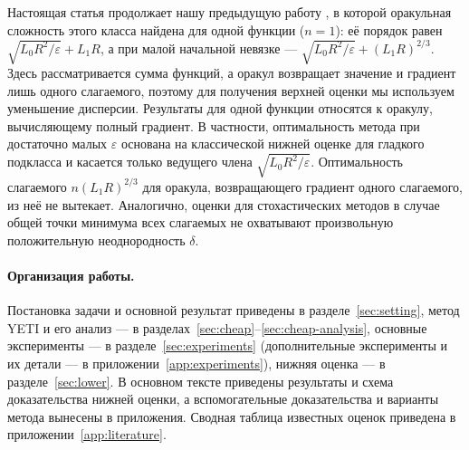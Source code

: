 Настоящая статья продолжает нашу предыдущую работу \citet{rudomanov2026everest}, в которой
оракульная сложность этого класса найдена для одной функции ($n=1$):
её порядок равен $\sqrt{L_0R^2/\varepsilon}+L_1R$, а при малой
начальной невязке --- $\sqrt{L_0R^2/\varepsilon}+(L_1R)^{2/3}$.
Здесь рассматривается сумма функций, а оракул возвращает значение
и градиент лишь одного слагаемого, поэтому для получения верхней оценки
мы используем уменьшение дисперсии.
Результаты для одной функции
\citep{vankov2025optimizing,tyurin2026accelerated} относятся
к оракулу, вычисляющему полный градиент. В частности, оптимальность
метода \citet{tyurin2026accelerated} при достаточно малых $\varepsilon$ основана
на классической нижней оценке для гладкого подкласса и касается только
ведущего члена $\sqrt{L_0R^2/\varepsilon}$. Оптимальность слагаемого
$n(L_1R)^{2/3}$ для оракула, возвращающего градиент одного слагаемого,
из неё не вытекает.
Аналогично,
оценки для стохастических методов в случае общей точки минимума всех слагаемых
\citep{gorbunov2024methods}
не охватывают произвольную положительную неоднородность $\delta$.

\paragraph{Организация работы.}
Постановка задачи и основной результат приведены в разделе~\ref{sec:setting},
метод YETI и его анализ --- в разделах~\ref{sec:cheap}--\ref{sec:cheap-analysis},
основные эксперименты --- в разделе~\ref{sec:experiments}
(дополнительные эксперименты и их детали --- в приложении~\ref{app:experiments}), нижняя оценка ---
в разделе~\ref{sec:lower}. В основном тексте приведены
результаты и схема доказательства нижней оценки, а вспомогательные
доказательства и варианты метода вынесены в приложения. Сводная таблица
известных оценок приведена в приложении~\ref{app:literature}.
